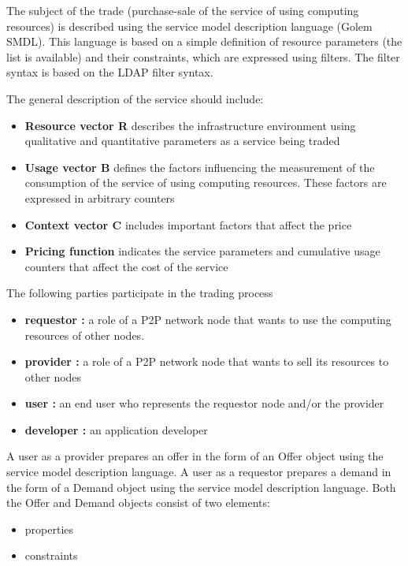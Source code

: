 The subject of the trade (purchase-sale of the service of using computing resources)
is described using the service model description language (Golem SMDL).
This language is based on a simple definition of resource parameters (the list is available) and their constraints, which are expressed using filters.
The filter syntax is based on the LDAP filter syntax.

The general description of the service should include:

\begin{itemize}
\item {\bf Resource vector R} describes the infrastructure environment using qualitative and quantitative parameters as a service being traded
\item {\bf Usage vector B} defines the factors influencing the measurement of the consumption of the service of using computing resources. These factors are expressed in arbitrary counters
\item {\bf Context vector C} includes important factors that affect the price
\item {\bf Pricing function} indicates the service parameters and cumulative usage counters that affect the cost of the service
\end{itemize}

The following parties participate in the trading process

\begin{itemize}
\item {\bf requestor :} a role of a P2P network node that wants to use the computing resources of other nodes.
\item {\bf provider :} a role of a P2P network node that wants to sell its resources to other nodes
\item {\bf user :} an end user who represents the requestor node and/or the provider
\item {\bf developer :} an application developer
\end{itemize}

A user as a provider prepares an offer in the form of an Offer object using the service model description language.
A user as a requestor prepares a demand in the form of a Demand object using the service model description language.
Both the Offer and Demand objects consist of two elements:

\begin{itemize}
\item properties
\item constraints
\end{itemize}

